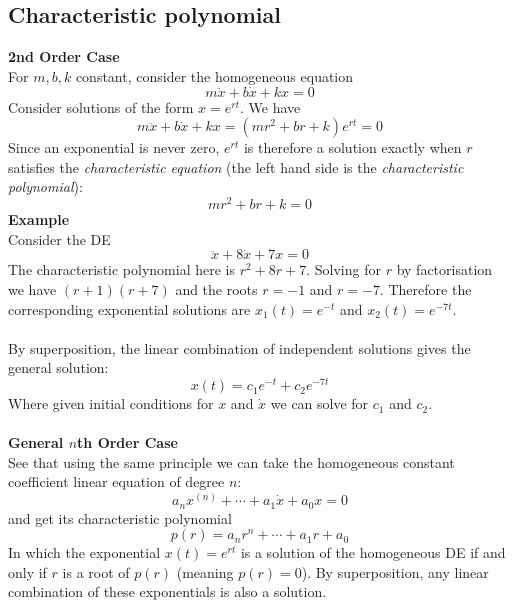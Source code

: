 \documentclass{report}
\begin{document}
\subsection{Characteristic polynomial}
\textbf{2nd Order Case}\\
For $m,b,k$ constant, consider the homogeneous equation
\begin{equation*}
m\ddot{x}+b\dot{x}+kx=0
\end{equation*}
Consider solutions of the form $x=e^{rt}$. We have
\begin{equation*}
m\ddot{x}+b\dot{x}+kx=(mr^2+br+k)e^{rt}=0
\end{equation*}
Since an exponential is never zero, $e^{rt}$ is therefore a solution exactly when $r$ satisfies the
\textit{characteristic equation} (the left hand side is the \textit{characteristic polynomial}):
\begin{equation*}
mr^2+br+k=0
\end{equation*}
\textbf{Example}\\
Consider the DE
\begin{equation*}
\ddot{x}+8\dot{x}+7x=0
\end{equation*}
The characteristic polynomial here is $r^2+8r+7$. Solving for $r$ by factorisation we have $(r+1)(r+7)$ and 
the roots $r=-1$ and $r=-7$. Therefore the corresponding exponential solutions are
$x_1(t)=e^{-t}$ and $x_2(t)=e^{-7t}$.\\
\vspace{1mm}\\
By superposition, the linear combination of independent solutions gives the general solution:
\begin{equation*}
x(t)=c_1e^{-t}+c_2e^{-7t}
\end{equation*}
Where given initial conditions for $x$ and $\dot{x}$ we can solve for $c_1$ and $c_2$.\\
\vspace{1mm}\\
\textbf{General $n$th Order Case}\\
See that using the same principle we can take the homogeneous constant coefficient linear equation of degree $n$:
\begin{equation*}
a_nx^{(n)}+\cdots+a_1\dot{x}+a_0x=0
\end{equation*}
and get its characteristic polynomial
\begin{equation*}
p(r)=a_nr^n+\cdots+a_1r+a_0
\end{equation*}
In which the exponential $x(t)=e^{rt}$ is a solution of the homogeneous DE if and only if $r$ is a root
of $p(r)$ (meaning $p(r)=0$). By superposition, any linear combination of these exponentials is also a solution.
\newpage
\end{document}
